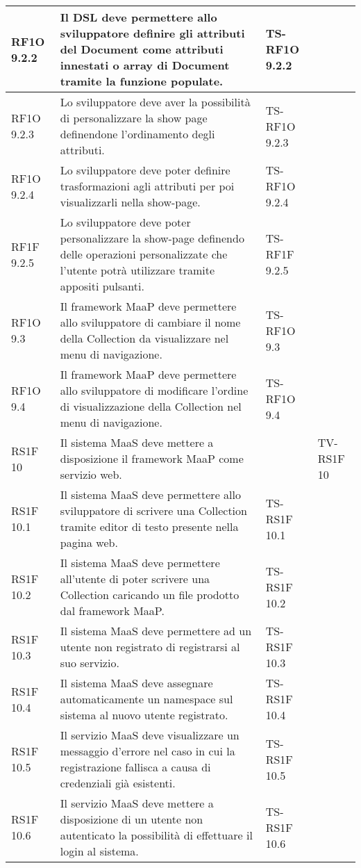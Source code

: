 \begin{center}
\begin{longtable}{| p{2cm} | p{6cm} | p{2.5cm} | p{2.5cm} | }
				RF1O 9.2.2 & 
				Il DSL deve permettere allo sviluppatore definire gli attributi del Document come attributi innestati o array di Document tramite la funzione populate. & TS-RF1O 9.2.2 & \\ \hline 
				RF1O 9.2.3 & 
				Lo sviluppatore deve aver la possibilità di personalizzare la show page definendone l’ordinamento degli attributi. & TS-RF1O 9.2.3 & \\ \hline 
				RF1O 9.2.4 & 
				Lo sviluppatore deve poter definire trasformazioni agli attributi per poi visualizzarli nella show-page. & TS-RF1O 9.2.4 & \\ \hline 
				RF1F 9.2.5 & 
				Lo sviluppatore deve poter personalizzare la show-page definendo delle operazioni personalizzate che l’utente potrà utilizzare tramite appositi pulsanti. & TS-RF1F 9.2.5 & \\ \hline 
				RF1O 9.3 & 
				Il framework MaaP deve permettere allo sviluppatore di cambiare il nome della Collection da visualizzare nel menu di navigazione. & TS-RF1O 9.3 & \\ \hline 
				RF1O 9.4 & 
				Il framework MaaP deve permettere allo sviluppatore di modificare l’ordine di visualizzazione della Collection nel menu di navigazione. & TS-RF1O 9.4 & \\ \hline 
				RS1F 10 & 
				Il sistema MaaS deve mettere a disposizione il framework MaaP come servizio web. &  & TV-RS1F 10 \\ \hline 
				RS1F 10.1 & 
				Il sistema MaaS deve permettere allo sviluppatore di scrivere una Collection tramite editor di testo presente nella pagina web. & TS-RS1F 10.1 & \\ \hline 
				RS1F 10.2 & 
				Il sistema MaaS deve permettere all’utente di poter scrivere una Collection caricando un file prodotto dal framework MaaP. & TS-RS1F 10.2 & \\ \hline 
				RS1F 10.3 & 
				Il sistema MaaS deve permettere ad un utente non registrato di registrarsi al suo servizio. & TS-RS1F 10.3 & \\ \hline 
				RS1F 10.4 & 
				Il sistema MaaS deve assegnare automaticamente un namespace sul sistema al nuovo utente registrato. & TS-RS1F 10.4 & \\ \hline 
				RS1F 10.5 & 
				Il servizio MaaS deve visualizzare un messaggio d’errore nel caso in cui la registrazione fallisca a causa di credenziali già esistenti. & TS-RS1F 10.5 & \\ \hline 
				RS1F 10.6 & 
				Il servizio MaaS deve mettere a disposizione di un utente non autenticato la possibilità di effettuare il login al sistema. & TS-RS1F 10.6 & \\ \hline 

\end{longtable}
\end{center}

